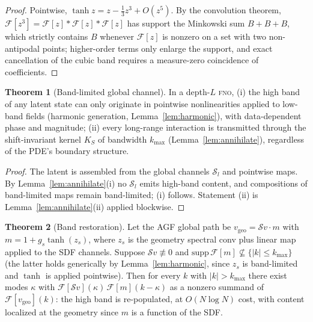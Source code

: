 \documentclass[11pt]{article}
\theoremstyle{definition}
\newtheorem{theorem}{Theorem}
\newcommand{\fno}{\textsc{fno}}
\begin{document}
\begin{proof}
Pointwise, $\tanh z = z - \tfrac13 z^3 + O(z^5)$. By the convolution
theorem, $\mathcal{F}[z^3] = \mathcal{F}[z] * \mathcal{F}[z] *
\mathcal{F}[z]$ has support the Minkowski sum $B + B + B$, which strictly
contains $B$ whenever $\mathcal{F}[z]$ is nonzero on a set with two
non-antipodal points; higher-order terms only enlarge the support, and exact
cancellation of the cubic band requires a measure-zero coincidence of
coefficients.
\end{proof}

\begin{theorem}[Band-limited global channel]
\label{thm:bandlimit}
In a depth-$L$ \fno{}, \textup{(i)} the high band of any latent state can
only originate in pointwise nonlinearities applied to low-band fields
(harmonic generation, Lemma~\ref{lem:harmonic}), with data-dependent phase
and magnitude; \textup{(ii)} every long-range interaction is transmitted
through the shift-invariant kernel $K_S$ of bandwidth $k_{\max}$
(Lemma~\ref{lem:annihilate}), regardless of the PDE's boundary structure.
\end{theorem}

\begin{proof}
The latent is assembled from the global channels $\mathcal{S}_l$ and
pointwise maps. By Lemma~\ref{lem:annihilate}(i) no $\mathcal{S}_l$ emits
high-band content, and compositions of band-limited maps remain
band-limited; (i) follows. Statement (ii) is Lemma~\ref{lem:annihilate}(ii)
applied blockwise.
\end{proof}

\begin{theorem}[Band restoration]
\label{thm:restore}
Let the AGF global path be $v_{\mathrm{geo}} = \mathcal{S} v \cdot m$ with
$m = 1 + g_s \tanh(z_s)$, where $z_s$ is the geometry spectral conv plus
linear map applied to the SDF channels. Suppose $\mathcal{S} v \not\equiv 0$
and $\mathrm{supp}\,\mathcal{F}[m] \not\subseteq \{|k| \le k_{\max}\}$ (the
latter holds generically by Lemma~\ref{lem:harmonic}, since $z_s$ is
band-limited and $\tanh$ is applied pointwise). Then for every $k$ with
$|k| > k_{\max}$ there exist modes $\kappa$ with
$\mathcal{F}[\mathcal{S} v](\kappa) \, \mathcal{F}[m](k - \kappa)$ as a
nonzero summand of $\mathcal{F}[v_{\mathrm{geo}}](k)$: the high band is
re-populated, at $O(N \log N)$ cost, with content localized at the geometry
since $m$ is a function of the SDF.
\end{theorem}
\end{document}
